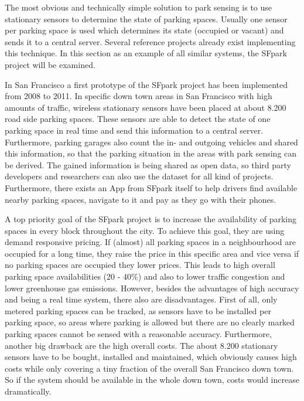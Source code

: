The most obvious and technically simple solution to park sensing is to use stationary sensors to determine the state of parking spaces. Usually one sensor per parking space is used which determines its state (occupied or vacant) and sends it to a central server. Several reference projects already exist \cite{SFPark, VehicleSense} implementing this technique. In this section as an example of all similar systems, the SFpark project will be examined.

In San Francisco a first prototype of the SFpark project \cite{SFPark} has been implemented from 2008 to 2011. In specific down town areas in San Francisco with high amounts of traffic, wireless stationary sensors have been placed at about 8.200 road side parking spaces. These sensors are able to detect the state of one parking space in real time and send this information to a central server. Furthermore, parking garages also count the in- and outgoing vehicles and shared this information, so that the parking situation in the areas with park sensing can be derived. The gained information is being shared as open data, so third party developers and researchers can also use the dataset for all kind of projects. Furthermore, there exists an App from SFpark itself to help drivers find available nearby parking spaces, navigate to it and pay as they go with their phones. 

A top priority goal of the SFpark project is to increase the availability of parking spaces in every block throughout the city. To achieve this goal, they are using demand responsive pricing. If (almost) all parking spaces in a neighbourhood are occupied for a long time, they raise the price in this specific area and vice versa if no parking spaces are occupied they lower prices. This leads to high overall parking space availabilities (20 - 40\%) and also to lower traffic congestion and lower greenhouse gas emissions. However, besides the advantages of high accuracy and being a real time system, there also are disadvantages. First of all, only metered parking spaces can be tracked, as sensors have to be installed per parking space, so areas where parking is allowed but there are no clearly marked parking spaces cannot be sensed with a reasonable accuracy. Furthermore, another big drawback are the high overall costs. The about 8.200 stationary sensors have to be bought, installed and maintained, which obviously causes high costs while only covering a tiny fraction of the overall San Francisco down town. So if the system should be available in the whole down town, costs would increase dramatically.

